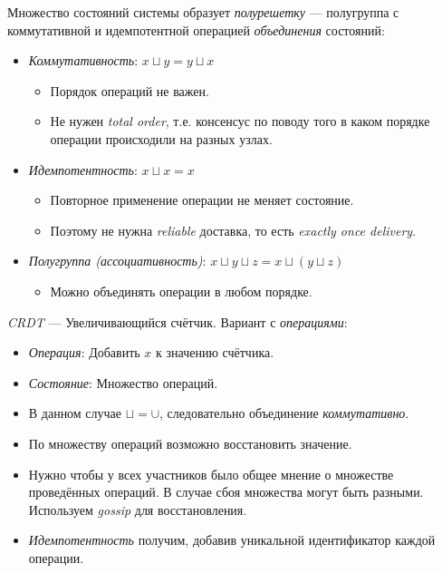 \begin{definition}
    Множество состояний системы образует \textit{полурешетку} ---
    полугруппа с коммутативной и идемпотентной
    операцией \textit{объединения} состояний:
    \begin{itemize}
        \item \textit{Коммутативность}: $x \sqcup y = y \sqcup x$
            \begin{itemize}
                \item Порядок операций не важен.
                \item Не нужен \textit{total order}, т.е. консенсус по поводу
                    того в каком порядке операции происходили на разных узлах.
            \end{itemize}
        \item \textit{Идемпотентность}: $x \sqcup x = x$
            \begin{itemize}
                \item Повторное применение операции не меняет состояние.
                \item Поэтому не нужна \textit{reliable} доставка, то есть
                    \textit{exactly once delivery}.
            \end{itemize}
        \item \textit{Полугруппа (ассоциативность)}:
            $x \sqcup y \sqcup z = x \sqcup (y \sqcup z)$
            \begin{itemize}
                \item Можно объединять операции в любом порядке.
            \end{itemize}
    \end{itemize}
\end{definition}

\begin{example}
    \textit{CRDT} --- Увеличивающийся счётчик.
    Вариант с \textit{операциями}:

    \begin{itemize}
        \item \textit{Операция}: Добавить $x$ к значению счётчика.
        \item \textit{Состояние}: Множество операций.
        \item В данном случае $\sqcup = \cup$, следовательно
            объединение \textit{коммутативно}.
        \item По множеству операций возможно восстановить значение.
        \item Нужно чтобы у всех участников было общее мнение о
            множестве проведённых операций. В случае сбоя множества
            могут быть разными. Используем \textit{gossip} для восстановления.
        \item \textit{Идемпотентность} получим, добавив уникальной
            идентификатор каждой операции.
    \end{itemize}
\end{example}

